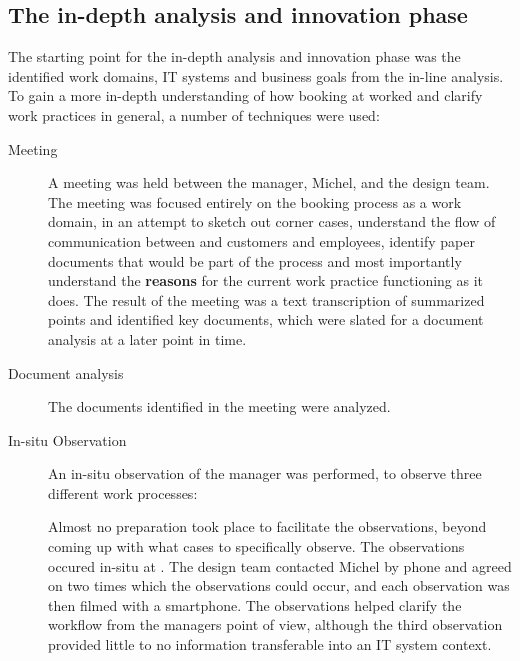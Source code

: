 \subsection{The in-depth analysis and innovation phase}
The starting point for the in-depth analysis and innovation phase was the
identified work domains, IT systems and business goals from the in-line
analysis.  To gain a more in-depth understanding of how booking at \gomonkey{}
worked and clarify work practices in general, a number of techniques were used:

\begin{description}
    \item [Meeting] A meeting was held
        between the manager, Michel, and the design team. The meeting was
        focused entirely on the booking process as a work domain, in an attempt
        to sketch out corner cases, understand the flow of communication between
        \gomonkey{} and customers and employees, identify paper documents that
        would be part of the process and most importantly understand the
        \textbf{reasons} for the current work practice functioning as it does.
        The result of the meeting was a text transcription of summarized points
        and identified key documents, which were slated for a document analysis
        at a later point in time. 

    \item [Document analysis] The documents identified in the meeting were
        analyzed. 

    \item [In-situ Observation] An in-situ observation of the manager was performed,
        to observe three different work processes: 
        Almost no preparation took place to facilitate the observations, beyond
        coming up with what cases to specifically observe. The observations
        occured in-situ at \gomonkey{}. The design team contacted Michel by
        phone and agreed on two times which the observations could occur, and
        each observation was then filmed with a smartphone. The observations
        helped clarify the workflow from the managers point of view, although
        the third observation provided little to no information transferable
        into an IT system context.


\end{description}
